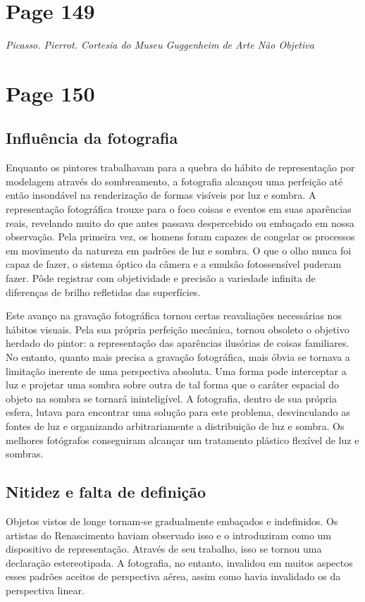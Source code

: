 \documentclass[a4paper]{article}
\begin{document}
\newpage
\section*{Page 149}

\noindent\textit{Picasso. Pierrot. Cortesia do Museu Guggenheim de Arte Não Objetiva}

\newpage
\section*{Page 150}

\subsection*{Influência da fotografia}
Enquanto os pintores trabalhavam para a quebra do hábito de representação por modelagem através do sombreamento, a fotografia alcançou uma perfeição até então insondável na renderização de formas visíveis por luz e sombra. A representação fotográfica trouxe para o foco coisas e eventos em suas aparências reais, revelando muito do que antes passava despercebido ou embaçado em nossa observação. Pela primeira vez, os homens foram capazes de congelar os processos em movimento da natureza em padrões de luz e sombra. O que o olho nunca foi capaz de fazer, o sistema óptico da câmera e a emulsão fotossensível puderam fazer. Pôde registrar com objetividade e precisão a variedade infinita de diferenças de brilho refletidas das superfícies.

Este avanço na gravação fotográfica tornou certas reavaliações necessárias nos hábitos visuais. Pela sua própria perfeição mecânica, tornou obsoleto o objetivo herdado do pintor: a representação das aparências ilusórias de coisas familiares. No entanto, quanto mais precisa a gravação fotográfica, mais óbvia se tornava a limitação inerente de uma perspectiva absoluta. Uma forma pode interceptar a luz e projetar uma sombra sobre outra de tal forma que o caráter espacial do objeto na sombra se tornará ininteligível. A fotografia, dentro de sua própria esfera, lutava para encontrar uma solução para este problema, desvinculando as fontes de luz e organizando arbitrariamente a distribuição de luz e sombra. Os melhores fotógrafos conseguiram alcançar um tratamento plástico flexível de luz e sombras.

\subsection*{Nitidez e falta de definição}
Objetos vistos de longe tornam-se gradualmente embaçados e indefinidos. Os artistas do Renascimento haviam observado isso e o introduziram como um dispositivo de representação. Através de seu trabalho, isso se tornou uma declaração estereotipada. A fotografia, no entanto, invalidou em muitos aspectos esses padrões aceitos de perspectiva aérea, assim como havia invalidado os da perspectiva linear.
\end{document}
